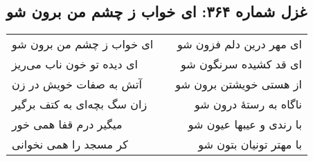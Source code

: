 \begin{center}
\section*{غزل شماره ۳۶۴: ای خواب ز چشم من برون شو}
\label{sec:364}
\begin{longtable}{l p{0.5cm} r}
ای خواب ز چشم من برون شو
&&
ای مهر درین دلم فزون شو
\\
ای دیده تو خون ناب می‌ریز
&&
ای قد کشیده سرنگون شو
\\
آتش به صفات خویش در زن
&&
از هستی خویشتن برون شو
\\
زان سگ بچه‌ای به کتف برگیر
&&
ناگاه به رستهٔ درون شو
\\
میگیر درم قفا همی خور
&&
با رندی و عیبها عیون شو
\\
کر مسجد را همی نخوانی
&&
با مهتر تونیان بتون شو
\\
\end{longtable}
\end{center}
